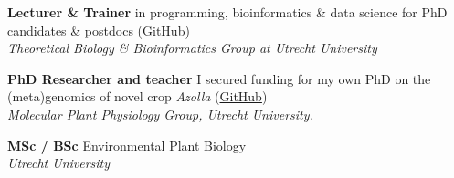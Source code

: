 \documentclass[a4paper,10pt]{article}
\begin{document}
{\begin{adjustbox}{valign=t}
\begin{minipage}[t]{0.6\textwidth}

\begin{description}
\raggedright
  \item[\normalfont \textcolor{ForestGreen}{\textbf{2022 -- now.}}] \textbf{Lecturer \&  Trainer} 
    in programming, bioinformatics \& data science for PhD candidates \& postdocs 
    (\href{https://github.com/lauralwd/professional_education}{GitHub})\\
    \textit{Theoretical Biology \& Bioinformatics Group at Utrecht University}
  \item[\normalfont \textcolor{ForestGreen}{\textbf{2017 -- 2022.}}] \textbf{PhD Researcher and teacher} 
    I secured funding for my own PhD on the (meta)genomics of novel crop \textit{Azolla} 
    (\href{https://github.com/lauralwd/azolla_phd_thesis}{GitHub})\\ 
    \textit{Molecular Plant Physiology Group, Utrecht University.}
  \item[\normalfont \textcolor{ForestGreen}{\textbf{2010 -- 2017.}}] \textbf{MSc / BSc} Environmental Plant Biology \\
    \textit{Utrecht University}
\end{description}



\end{minipage}
\end{adjustbox}}
\end{document}
